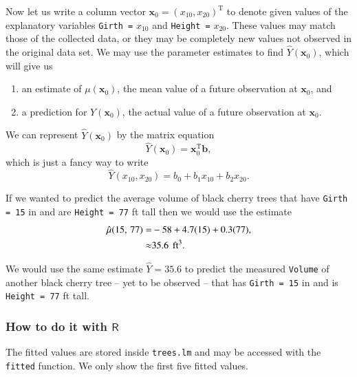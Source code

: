 \documentclass[captions=tableheading]{scrbook}
\begin{document}
Now let us write a column vector \(\mathbf{x}_{0}=(x_{10},x_{20})^{\mathrm{T}}\) to denote given values of the explanatory variables \texttt{Girth =} \(x_{10}\) and \texttt{Height =} \(x_{20}\). These values may match those of the collected data, or they may be completely new values not observed in the original data set. We may use the parameter estimates to find \(\hat{Y}(\mathbf{x}_{0})\), which will give us

\begin{enumerate}
\item an estimate of \(\mu(\mathbf{x}_{0})\), the mean value of a future observation at \(\mathbf{x}_{0}\), and
\item a prediction for \(Y(\mathbf{x}_{0})\), the actual value of a future observation at \(\mathbf{x}_{0}\).
\end{enumerate}

We can represent \(\hat{Y}(\mathbf{x}_{0})\) by the matrix equation
\begin{equation}
\hat{Y}(\mathbf{x}_{0})=\mathbf{x}_{0}^{\mathrm{T}}\mathbf{b},\label{eq-mlr-single-yhat-matrix}
\end{equation}
which is just a fancy way to write
\begin{equation}
\hat{Y}(x_{10},x_{20})=b_{0}+b_{1}x_{10}+b_{2}x_{20}.
\end{equation}
 
\begin{example}
If we wanted to predict the average volume of black cherry trees that have \texttt{Girth = 15} in and are \texttt{Height = 77} ft tall then we would use the estimate 
\begin{alignat*}{1}
\hat{\mu}(15,\,77)= & -58+4.7(15)+0.3(77),\\
\approx & 35.6\mbox{\,\ ft}^{3}.
\end{alignat*}

We would use the same estimate \(\hat{Y}=35.6\) to predict the measured \texttt{Volume} of another black cherry tree -- yet to be observed -- that has \texttt{Girth = 15} in and is \texttt{Height = 77} ft tall.
\end{example}
\subsubsection{How to do it with \(\mathsf{R}\)}
\label{sec-12-2-2-1}


The fitted values are stored inside \texttt{trees.lm} and may be accessed with the \texttt{fitted} function. We only show the first five fitted values.
\end{document}
